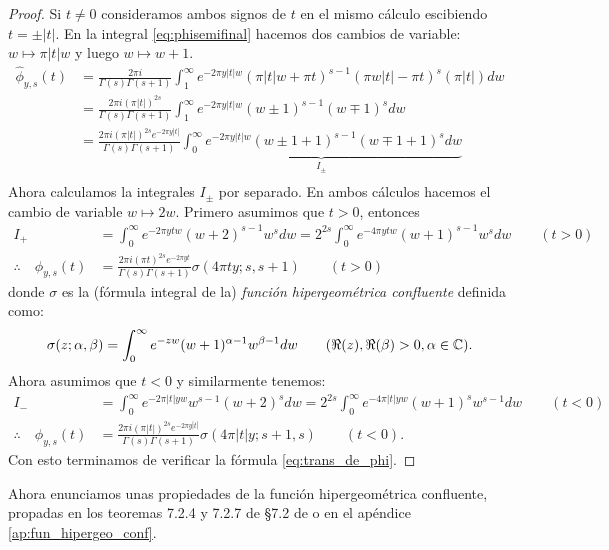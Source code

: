 \documentclass[../../tesis_maestria]{subfiles}
\begin{document}
\begin{proof}
Si $t\neq0$ consideramos ambos signos de $t$ en el mismo c\'alculo escibiendo $t=\pm|t|$. En la
integral \eqref{eq:phisemifinal} hacemos dos cambios de variable: $w\mapsto\pi |t| w$ y luego
$w\mapsto w+1$.
\begin{align}
  \hat{\phi}_{y,s}(t)&=
  \frac{2\pi i}{\Gamma(s)\Gamma(s+1)}
  \int_1^{\infty}e^{-2\pi y|t|w}(\pi|t|w+\pi t)^{s-1}(\pi w|t|-\pi t)^s(\pi |t|)dw\nonumber\\
  &=\frac{2\pi i(\pi |t|)^{2s}}{\Gamma(s)\Gamma(s+1)}
  \int_1^{\infty}e^{-2\pi y|t|w}(w\pm1)^{s-1}(w\mp 1)^sdw\nonumber\\
  &=\frac{2\pi i(\pi |t|)^{2s}e^{-2\pi y|t|}}{\Gamma(s)\Gamma(s+1)}
    \underset{I_{\pm}}{\underbrace{\int_0^{\infty}e^{-2\pi y|t|w}(w\pm1+1)^{s-1}(w\mp1+1)^sdw}}\nonumber\\
\end{align}
Ahora calculamos la integrales $I_{\pm}$ por separado. En ambos c\'alculos hacemos el cambio de
variable $w\mapsto 2w$. Primero asumimos que $t>0$, entonces
\begin{align*}
  I_+
  &=\int_0^{\infty}e^{-2\pi ytw}(w+2)^{s-1}w^sdw=2^{2s}\int_0^{\infty}e^{-4\pi ytw}(w+1)^{s-1}w^sdw
    \qquad(t>0)\\
  \therefore\quad\hat{\phi}_{y,s}(t)
  &=\frac{2\pi i(\pi t)^{2s}e^{-2\pi yt}}{\Gamma(s)\Gamma(s+1)}\sigma(4\pi ty;s,s+1)\qquad(t>0)
\end{align*}
donde $\sigma$ es la (f\'ormula integral de la) \emph{funci\'on hipergeom\'etrica confluente} definida
como:
\[
  \sigma(z;\alpha,\beta)=\int_0^{\infty}e^{-zw}(w+1)^{\alpha-1}w^{\beta-1}dw
  \qquad(\Re(z),\Re(\beta)>0,\alpha\in\mathbb{C}).
\]
Ahora asumimos que $t<0$ y similarmente tenemos:
\begin{align*}
  I_{-}
  &=\int_0^{\infty}e^{-2\pi|t|yw}w^{s-1}(w+2)^sdw=2^{2s}\int_0^{\infty}e^{-4\pi|t|yw}(w+1)^sw^{s-1}dw
    \qquad(t<0)\\
  \therefore\quad\hat{\phi}_{y,s}(t)
  &=\frac{2\pi i(\pi |t|)^{2s}e^{-2\pi y|t|}}{\Gamma(s)\Gamma(s+1)}\sigma(4\pi|t|y;s+1,s)\qquad(t<0).
\end{align*}
Con esto terminamos de verificar la f\'ormula \eqref{eq:trans_de_phi}.
\end{proof}

Ahora enunciamos unas propiedades de la funci\'on hipergeom\'etrica confluente, propadas en
los teoremas 7.2.4 y 7.2.7 de \S 7.2 de \cite{MiyakeMF} o en el ap\'endice
\ref{ap:fun_hipergeo_conf}.
\end{document}
